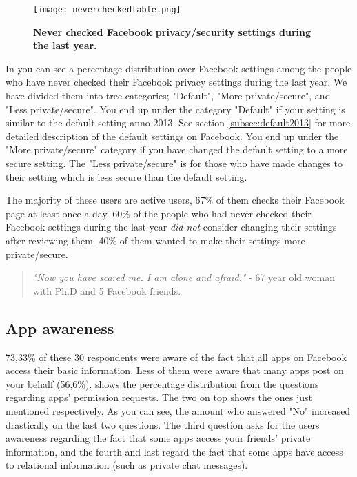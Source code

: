 \begin{figure}[h!]
\centering
\texttt{[image: nevercheckedtable.png]}
\caption[Never checked Facebook privacy/security settings during the last year]{\textbf{Never checked Facebook privacy/security settings during the last year.}} 
\label{fig:neverchecked}
\end{figure}

In  you can see a percentage distribution over Facebook settings among the people who have never checked their Facebook privacy settings during the last year. We have divided them into tree categories; "Default", "More private/secure", and "Less private/secure". You end up under the category "Default" if your setting is similar to the default setting anno 2013. See section \ref{subsec:default2013} for more detailed description of the default settings on Facebook. You end up under the "More private/secure" category if you have changed the default setting to a more secure setting. The "Less private/secure" is for those who have made changes to their setting which is less secure than the default setting. 

The majority of these users are active users, 67\% of them checks their Facebook page at least once a day. 60\% of the people who had never checked their Facebook settings during the last year \textit{did not} consider changing their settings after reviewing them. 40\% of them wanted to make their settings more private/secure. 


\begin{quote}
\textit{"Now you have scared me. I am alone and afraid."} - 67 year old woman with Ph.D and 5 Facebook friends. 
\end{quote}

\subsection{App awareness}
73,33\% of these 30 respondents were aware of the fact that all apps on Facebook access their basic information. Less of them were aware that many apps post on your behalf (56,6\%).  shows the percentage distribution from the questions regarding apps' permission requests. The two on top shows the ones just mentioned respectively. As you can see, the amount who answered "No" increased drastically on the last two questions. The third question asks for the users awareness regarding the fact that some apps access your friends' private information, and the fourth and last regard the fact that some apps have access to relational information (such as private chat messages). 

